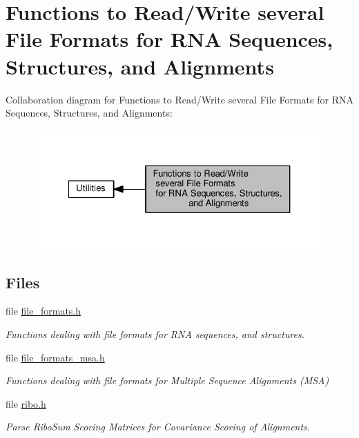 \hypertarget{group__file__utils}{}\section{Functions to Read/\+Write several File Formats for R\+NA Sequences, Structures, and Alignments}
\label{group__file__utils}
Collaboration diagram for Functions to Read/\+Write several File Formats for R\+NA Sequences, Structures, and Alignments\+:
\nopagebreak
\begin{figure}[H]
\begin{center}
\leavevmode
\includegraphics[width=327pt]{group__file__utils}
\end{center}
\end{figure}
\subsection*{Files}
\begin{DoxyCompactItemize}
\item 
file \hyperlink{file__formats_8h}{file\+\_\+formats.\+h}
\begin{DoxyCompactList}\small\item\em Functions dealing with file formats for R\+NA sequences, and structures. \end{DoxyCompactList}\item 
file \hyperlink{file__formats__msa_8h}{file\+\_\+formats\+\_\+msa.\+h}
\begin{DoxyCompactList}\small\item\em Functions dealing with file formats for Multiple Sequence Alignments (M\+SA) \end{DoxyCompactList}\item 
file \hyperlink{ribo_8h}{ribo.\+h}
\begin{DoxyCompactList}\small\item\em Parse Ribo\+Sum Scoring Matrices for Covariance Scoring of Alignments. \end{DoxyCompactList}\end{DoxyCompactItemize}
